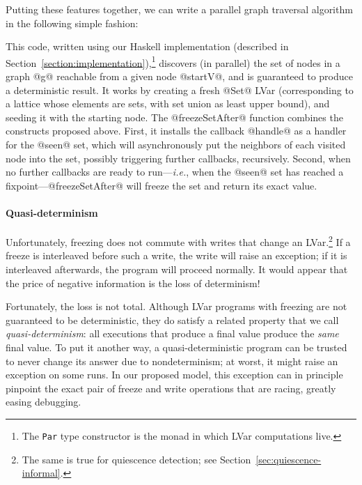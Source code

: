 Putting these features together, we can write a parallel graph traversal algorithm
in the following simple fashion:



\noindent
This code, written using our Haskell implementation (described in Section~\ref{section:implementation}),\footnote{The
  \texttt{Par} type constructor is the monad in which LVar computations live.}
discovers (in parallel) the set of nodes in a graph @g@ reachable from a given node
@startV@, and is guaranteed to produce a deterministic result.  It works by creating a fresh @Set@ LVar
(corresponding to a lattice whose elements are sets, with set union as least upper bound), and seeding it
with the starting node.  The @freezeSetAfter@ function combines the constructs
proposed above.  First, it installs the callback @handle@ as a handler for the
@seen@ set, which will asynchronously put the neighbors of each visited node
into the set, possibly triggering further callbacks, recursively.  Second, when
no further callbacks are ready to run---\emph{i.e.}, when the @seen@ set has
reached a fixpoint---@freezeSetAfter@ will freeze the set and return its exact
value.

\paragraph{Quasi-determinism}

Unfortunately, freezing does not commute with writes that change an
LVar.\footnote{The same is true for quiescence detection; see
  Section~\ref{sec:quiescence-informal}.}  If a freeze is interleaved before
such a write, the write will raise an exception; if it is interleaved
afterwards, the program will proceed normally.  It would appear that the price
of negative information is the loss of determinism!

Fortunately, the loss is not total.  Although LVar programs with freezing are not
guaranteed to be deterministic, they do satisfy a related property that we call
\emph{quasi-determinism}: all executions that produce a final value produce the
\emph{same} final value.  To put it another way, a quasi-deterministic program
can be trusted to never change its answer due to nondeterminism; at worst, it
might raise an exception on some runs.  In our proposed model, this exception
can in principle pinpoint the exact pair of freeze and write operations
that are racing, greatly
easing debugging.  


